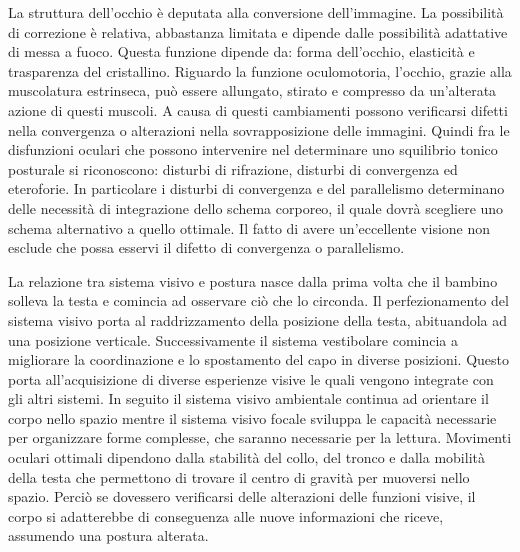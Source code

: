 La struttura dell’occhio è deputata alla conversione dell’immagine. La possibilità di correzione è relativa, abbastanza limitata e dipende dalle possibilità adattative di messa a fuoco. Questa funzione dipende da: forma dell’occhio, elasticità e trasparenza del cristallino. Riguardo la funzione oculomotoria, l’occhio, grazie alla muscolatura estrinseca, può essere allungato, stirato e compresso da un’alterata azione di questi muscoli. A causa di questi cambiamenti possono verificarsi difetti nella convergenza o alterazioni nella sovrapposizione delle immagini. Quindi fra le disfunzioni oculari che possono intervenire nel determinare uno squilibrio tonico posturale si riconoscono: disturbi di rifrazione, disturbi di convergenza  ed eteroforie. In particolare i disturbi di convergenza e del parallelismo determinano delle necessità di integrazione dello schema corporeo, il quale dovrà scegliere uno schema alternativo a quello ottimale. Il fatto di avere un’eccellente visione non esclude che possa esservi il difetto di convergenza o parallelismo.

La relazione tra sistema visivo e postura nasce dalla prima volta che il bambino solleva la testa e comincia ad osservare ciò che lo circonda. Il perfezionamento del sistema visivo porta al raddrizzamento della posizione della testa, abituandola ad una posizione verticale. Successivamente il sistema vestibolare comincia a migliorare la coordinazione e lo spostamento del capo in diverse posizioni. Questo porta all’acquisizione di diverse esperienze visive le quali vengono integrate con gli altri sistemi. In seguito il sistema visivo ambientale continua ad orientare il corpo nello spazio mentre il sistema visivo focale sviluppa le capacità necessarie per organizzare forme complesse, che saranno necessarie per la lettura. Movimenti oculari ottimali dipendono dalla stabilità del collo, del tronco e dalla mobilità della testa che permettono di trovare il centro di gravità per muoversi nello spazio. Perciò se dovessero verificarsi delle alterazioni delle funzioni visive, il corpo si adatterebbe di conseguenza alle nuove informazioni che riceve, assumendo una postura alterata.
\\\

